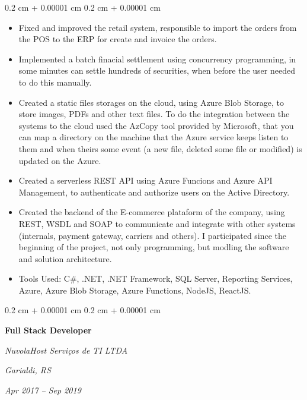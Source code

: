 \documentclass[10pt, letterpaper]{article}
\newenvironment{highlights}{
    \begin{itemize}[
        topsep=0.10 cm,
        parsep=0.10 cm,
        partopsep=0pt,
        itemsep=0pt,
        leftmargin=0.4 cm + 10pt
    ]
}{
    \end{itemize}
} %
\newenvironment{onecolentry}{
    \begin{adjustwidth}{
        0.2 cm + 0.00001 cm
    }{
        0.2 cm + 0.00001 cm
    }
}{
    \end{adjustwidth}
} %
\newenvironment{twocolentry}[2][]{
    \onecolentry
    \def\secondColumn{#2}
    \setcolumnwidth{\fill, 4.5 cm}
    \begin{paracol}{2}
}{
    \switchcolumn \raggedleft \secondColumn
    \end{paracol}
    \endonecolentry
} %
\begin{document}
        \vspace{0.10 cm}
        \begin{onecolentry}
            \begin{highlights}
                \item Fixed and improved the retail system, responsible to import the orders from the POS to the ERP for create and invoice the orders.
                \item Implemented a batch finacial settlement using concurrency programming, in some minutes can settle hundreds of securities, when before the user needed to do this manually.
                \item Created a static files storages on the cloud, using Azure Blob Storage, to store images, PDFs and other text files. To do the integration between the systems to the cloud used the AzCopy tool provided by Microsoft, that you can map a directory on the machine that the Azure service keeps listen to them and when theirs some event (a new file, deleted some file or modified) is updated on the Azure.
                \item Created a serverless REST API using Azure Funcions and Azure API Management, to authenticate and authorize users on the Active Directory.
                \item Created the backend of the E-commerce plataform of the company, using REST, WSDL and SOAP to communicate and integrate with other systems (internals, payment gateway, carriers and others). I participated since the beginning of the project, not only programming, but modling the software and solution architecture.
                \item Tools Used: C\#, .NET, .NET Framework, SQL Server, Reporting Services, Azure, Azure Blob Storage, Azure Functions, NodeJS, ReactJS.
            \end{highlights}
        \end{onecolentry}
        
        
        \begin{twocolentry}{
        \textit{Garialdi, RS}    
            
        \textit{Apr 2017 – Sep 2019}}
            \textbf{Full Stack Developer}
            
            \textit{NuvolaHost Serviços de TI LTDA}
        \end{twocolentry}
\end{document}
